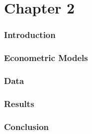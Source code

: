 \part{Chapter 2} 

\section{Introduction}

\blindtext

\section{Econometric Models} 
\blindtext

\section{Data}
\blindtext

\section{Results}
\blindtext

\section{Conclusion}

\blindtext